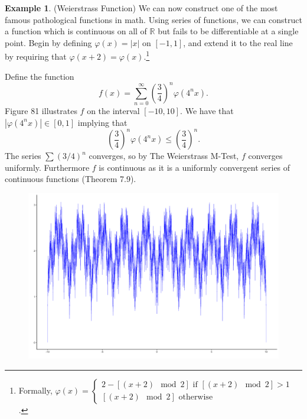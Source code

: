 \documentclass{article}
\newcommand{\R}{\mathbb{R}}
\theoremstyle{definition}
\newtheorem{example}{Example}[section]
\begin{document}
\begin{example}(Weierstrass Function)
	We can now construct one of the most famous pathological functions in math. Using series of functions, we can construct a function which is continuous on all of $ \R $ but fails to be differentiable at a single point. Begin by defining $ \varphi(x)=|x|$ on $ [-1,1] $, and extend it to the real line by requiring that $ \varphi(x+2)=\varphi(x) $.\footnote{Formally, $ \varphi(x)= \begin{cases}
			2 - [(x+2) \mod 2]\text{ if }[(x+2) \mod 2] > 1\\
			[(x+2) \mod 2] \text{ otherwise}
		\end{cases} $.}
	
	 Define the function 
	$$ f(x) = \sum_{n=0}^{\infty}\left(\frac{3}{4}\right)^n\varphi(4^nx).$$ Figure 81 illustrates $ f $ on the interval $ [-10,10] $. We have that $ |\varphi(4^nx)|\in[0,1] $ implying that $$ \left(\frac{3}{4}\right)^n\varphi(4^nx) \le \left(\frac{3}{4}\right)^n .$$ The series $\sum (3/4)^n $ converges, so by The Weierstrass M-Test, $ f $ converges uniformly. Furthermore $ f $ is continuous as it is a uniformly convergent series of continuous functions (Theorem 7.9). 
	
	\begin{figure}[h!]
		\centering
		\includegraphics[width=0.9\linewidth]{figures/weierstrass}
		\caption{}
		\label{fig:weierstrass}
	\end{figure}
	

\end{example}
\end{document}
